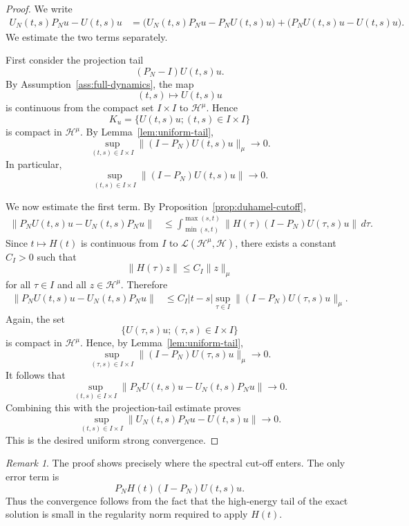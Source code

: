 \documentclass[11pt]{amsart}
\theoremstyle{plain}
\theoremstyle{definition}
\theoremstyle{remark}
\newtheorem{remark}[theorem]{Remark}
\newcommand{\Hilb}{\mathcal H}
\begin{document}
\begin{proof}
We write
\[
\begin{aligned}
        U_N(t,s)P_Nu-U(t,s)u
        &=
        \bigl(U_N(t,s)P_Nu-P_NU(t,s)u\bigr)
        +
        \bigl(P_NU(t,s)u-U(t,s)u\bigr).
\end{aligned}
\]
We estimate the two terms separately.

First consider the projection tail
\[
        (P_N-I)U(t,s)u.
\]
By Assumption~\ref{ass:full-dynamics}, the map
\[
        (t,s)\longmapsto U(t,s)u
\]
is continuous from the compact set \(I\times I\) to \(\Hilb^\mu\).
Hence
\[
        K_u=\{U(t,s)u;(t,s)\in I\times I\}
\]
is compact in \(\Hilb^\mu\).  By Lemma~\ref{lem:uniform-tail},
\[
        \sup_{(t,s)\in I\times I}
        \|(I-P_N)U(t,s)u\|_\mu
        \longrightarrow0.
\]
In particular,
\[
        \sup_{(t,s)\in I\times I}
        \|(I-P_N)U(t,s)u\|
        \longrightarrow0.
\]

We now estimate the first term.  By
Proposition~\ref{prop:duhamel-cutoff},
\[
\begin{aligned}
        \|P_NU(t,s)u-U_N(t,s)P_Nu\|
        &\leq
        \int_{\min(s,t)}^{\max(s,t)}
        \|H(\tau)(I-P_N)U(\tau,s)u\|
        \,d\tau .
\end{aligned}
\]
Since \(t\mapsto H(t)\) is continuous from \(I\) to
\(\mathcal L(\Hilb^\mu,\Hilb)\), there exists a constant \(C_I>0\) such
that
\[
        \|H(\tau)z\|
        \leq C_I\|z\|_\mu
\]
for all \(\tau\in I\) and all \(z\in\Hilb^\mu\).  Therefore
\[
\begin{aligned}
        \|P_NU(t,s)u-U_N(t,s)P_Nu\|
        &\leq
        C_I |t-s|
        \sup_{\tau\in I}
        \|(I-P_N)U(\tau,s)u\|_\mu .
\end{aligned}
\]
Again, the set
\[
        \{U(\tau,s)u;(\tau,s)\in I\times I\}
\]
is compact in \(\Hilb^\mu\).  Hence, by
Lemma~\ref{lem:uniform-tail},
\[
        \sup_{(\tau,s)\in I\times I}
        \|(I-P_N)U(\tau,s)u\|_\mu
        \longrightarrow0.
\]
It follows that
\[
        \sup_{(t,s)\in I\times I}
        \|P_NU(t,s)u-U_N(t,s)P_Nu\|
        \longrightarrow0.
\]
Combining this with the projection-tail estimate proves
\[
        \sup_{(t,s)\in I\times I}
        \|U_N(t,s)P_Nu-U(t,s)u\|
        \longrightarrow0.
\]
This is the desired uniform strong convergence.
\end{proof}

\begin{remark}
The proof shows precisely where the spectral cut-off enters.  The only
error term is
\[
        P_NH(t)(I-P_N)U(t,s)u.
\]
Thus the convergence follows from the fact that the high-energy tail of
the exact solution is small in the regularity norm required to apply
\(H(t)\).
\end{remark}
\end{document}
